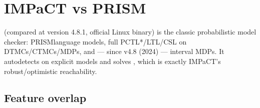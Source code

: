 \documentclass[a4paper,10pt,english]{sphinxmanual}
\begin{document}
\sphinxstepscope


\section{IMPaCT vs PRISM}
\label{\detokenize{comparison/impact-vs-prism:impact-vs-prism}}\label{\detokenize{comparison/impact-vs-prism::doc}}
\sphinxAtStartPar
{} (compared at version 4.8.1, official Linux
binary) is the classic probabilistic model checker: PRISM\sphinxhyphen{}language models, full
PCTL*/LTL/CSL on DTMCs/CTMCs/MDPs, and — since v4.8 (2024) — interval MDPs. It
auto\sphinxhyphen{}detects  on explicit models and solves ,
which is exactly IMPaCT’s robust/optimistic reachability.


\subsection{Feature overlap}
\label{\detokenize{comparison/impact-vs-prism:feature-overlap}}
\end{document}
